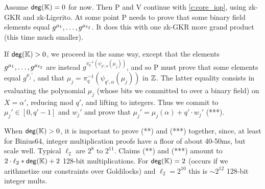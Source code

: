 \documentclass[11pt,letterpaper,usenames,dvipsnames]{article}
\begin{document}
Assume $\mathsf{deg}(\mathbb{K})=0$ for now. Then P and V continue with \cref{c:core_iop}, using zk-GKR and zk-Ligerito. At some point P needs to prove that some binary field elements equal $g^{\mu_1},\ldots, g^{\mu_{\ell_2}}$. It does this with one zk-GKR more grand product (this time much smaller).

If $\mathsf{deg}(\mathbb{K})>0$, we proceed in the same way, except that the elements $g^{\mu_1},\ldots, g^{\mu_{\ell_2}}$ are instead $g^{\pi_q^{-1}(\psi_{q',\alpha}(\mu_j))}$, and so P must prove that some elements equal $g^{\mu_j'}$, and that $\mu_j = \pi_q^{-1}(\psi_{q',\alpha}(\mu_j))$ in $\mathbb{Z}$. The latter equality  consists in evaluating the polynomial $\mu_j$ (whose bits we committed to over a binary field) on $X=\alpha'$, reducing mod $q'$, and lifting to integers. Thus we commit to $\mu_j'\in [0, q'-1]$ and $w_j'$ and prove that $\mu_j' = \mu_j(\alpha) + q' \cdot w_j'$ (***). 

When $\mathsf{deg}(\mathbb{K})>0$, it is important to prove (**) and (***) together, since, at least for Binius64, integer multiplication proofs have a floor of about 40-50ms, but scale well.  Typical $\ell_2$ are $2^{8}$ to $2^{11}$. Claims (**) and (***) amount to $2\cdot \ell_2*\mathsf{deg}(\mathbb{K}) +2$ 128-bit multiplications. For $\mathsf{deg}(\mathbb{K})=2$ (occurs if we arithmetize our constraints over Goldilocks) and $\ell_2=2^{10}$ this is $\sim 2^{12}$ 128-bit integer mults. 
\end{document}
